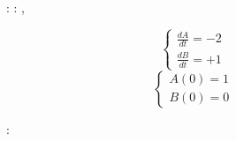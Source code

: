 \begin{figure}[t]
\begin{minipage}[t]{\columnwidth}
\begin{minipage}[c]{0.75\columnwidth}
\begin{CodeInput}
\begin{Highlighting}[]
: \OperatorTok{=}\KeywordTok{(}\OperatorTok{=}\KeywordTok{)}
: \OperatorTok{=}\KeywordTok{(}\OperatorTok{=}\KeywordTok{)}
\OperatorTok{=}\KeywordTok{(}
\OperatorTok{=}\KeywordTok{[} \OperatorTok{*}\KeywordTok{]},
\OperatorTok{=}\NormalTok{\KeywordTok{[}B\KeywordTok{]},}
\OperatorTok{=}\NormalTok{,}
\KeywordTok{    )}
        \end{Highlighting}
        \end{CodeInput}
      \end{minipage}%
      \begin{minipage}[c]{0.25\columnwidth}
        \centering 
        \[
        \begin{cases}
            \frac{dA}{dt} = -2 \\
            \frac{dB}{dt} = +1
        \end{cases}
        \]
        \[
        \begin{cases}
            A(0) = 1 \\
            B(0) = 0
        \end{cases}
        \]
      \end{minipage}%
    \end{minipage}%
    \newline
    \begin{minipage}[t]{\columnwidth}
        \centering 
        \begin{minipage}[c]{0.75\columnwidth}
\centering 
\begin{CodeInput}
\begin{Highlighting}[]
\KeywordTok{(}\KeywordTok{)}:


\end{Highlighting}
\end{CodeInput}
\end{minipage}
\end{minipage}
\end{figure}
